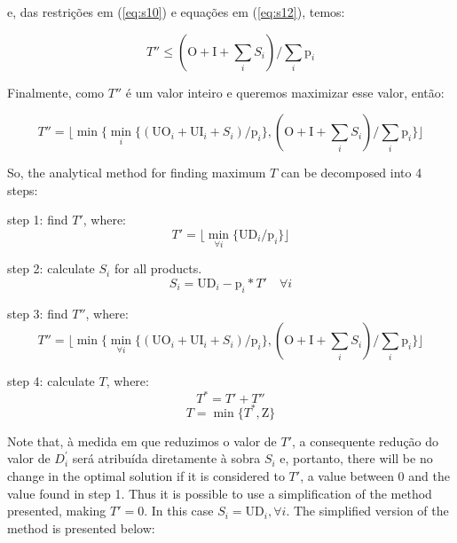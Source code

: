 \documentclass[authoryear,manuscript,12pt]{elsarticle}
\begin{document}
\noindent e, das restrições em (\ref{eq:s10}) e equações em (\ref{eq:s12}), temos:

\begin{equation}
\label{eq:s14}
 T'' \leq (\textrm{O} + \textrm{I} + \sum_i S_i) / \sum_i \textrm{p}_i
\end{equation}

Finalmente, como $T''$ é um valor inteiro e queremos maximizar esse valor, então:

\begin{equation}
\label{eq:s15}
 T'' = \lfloor\min\{\min_i\{ (\textrm{UO}_i + \textrm{UI}_i + S_i) / \textrm{p}_i\}, (\textrm{O} + \textrm{I} + \sum_i S_i) / \sum_i \textrm{p}_i \}\rfloor
\end{equation}

So, the analytical method for finding maximum $T$ can be decomposed into 4 steps:

step 1: find $T'$, where:
\begin{equation}
T' = \lfloor{\min_{\forall i} \{\textrm{UD}_i / \textrm{p}_i\}}\rfloor
\end{equation}

step 2: calculate $S_i$ for all products.
\begin{equation}
\label{eq:unmet}
S_i = \textrm{UD}_i - \textrm{p}_i * T' \quad \forall i
\end{equation}

step 3: find $T''$, where:
\begin{equation}
T'' = \lfloor{\min \{\min_{\forall i} \{(\textrm{UO}_i + \textrm{UI}_i + S_i) / \textrm{p}_i\},(\textrm{O} + \textrm{I} + \sum_i {S_i}) / \sum_i {\textrm{p}_i}\}}\rfloor
\end{equation}

step 4: calculate $T$, where: 
\begin{equation}
T^* = T' + T''
\end{equation}
\begin{equation}
T = \min \{T^* , \textrm{Z}\}
\end{equation}

Note that, à medida em que reduzimos o valor de $T'$, a consequente redução do valor de $D_{i}^{'}$ será atribuída diretamente à sobra $S_i$ e, portanto, there will be no change in the optimal solution if it is considered to $T'$, a value between 0 and the value found in step 1. Thus it is possible to use a simplification of the method presented, making $T' = 0$. In this case $S_i = \textrm{UD}_i, \forall i$. The simplified version of the method is presented below:
\end{document}
